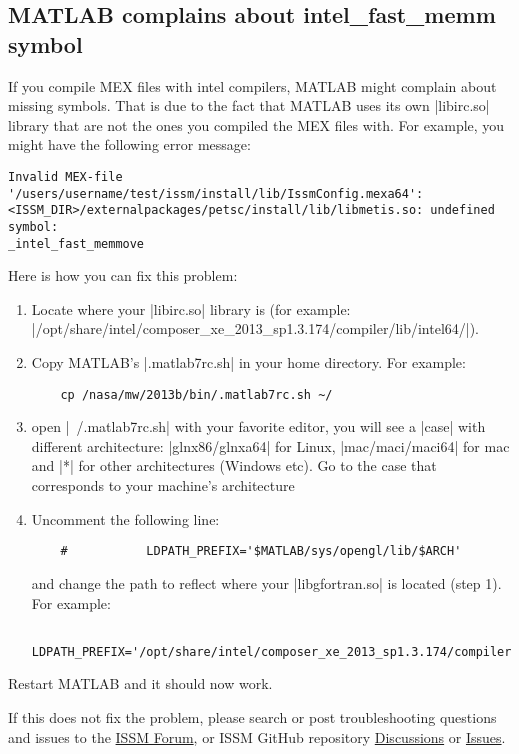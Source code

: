 \subsection*{MATLAB complains about intel\_fast\_memm symbol}%
If you compile MEX files with intel compilers, MATLAB might complain about missing symbols. That is due to the fact that MATLAB uses its own \lstinlinebg|libirc.so| library that are not the ones you compiled the MEX files with. For example, you might have the following error message:
\begin{lstlisting}
Invalid MEX-file '/users/username/test/issm/install/lib/IssmConfig.mexa64':
<ISSM_DIR>/externalpackages/petsc/install/lib/libmetis.so: undefined symbol:
_intel_fast_memmove
\end{lstlisting}

Here is how you can fix this problem:
\begin{enumerate}
	\item Locate where your \lstinlinebg|libirc.so| library is (for example: \newline\lstinlinebg|/opt/share/intel/composer_xe_2013_sp1.3.174/compiler/lib/intel64/|).
	\item Copy MATLAB's \lstinlinebg|.matlab7rc.sh| in your home directory. For example:
	\begin{lstlisting}
	cp /nasa/mw/2013b/bin/.matlab7rc.sh ~/ 
	\end{lstlisting}
	\item open \lstinlinebg|~/.matlab7rc.sh| with your favorite editor, you will see a \lstinlinebg|case| with different architecture: \lstinlinebg|glnx86/glnxa64| for Linux, \lstinlinebg|mac/maci/maci64| for mac and \lstinlinebg|*| for other architectures (Windows etc). Go to the case that corresponds to your machine's architecture
	\item Uncomment the following line:
	\begin{lstlisting}
	#           LDPATH_PREFIX='$MATLAB/sys/opengl/lib/$ARCH'
	\end{lstlisting}
	and change the path to reflect where your \lstinlinebg|libgfortran.so| is located (step 1). For example:
	\begin{lstlisting}
	LDPATH_PREFIX='/opt/share/intel/composer_xe_2013_sp1.3.174/compiler/lib/intel64/'
	\end{lstlisting}
\end{enumerate}

Restart MATLAB and it should now work.

If this does not fix the problem, please search or post troubleshooting questions and issues to the \href{https://issm.ess.uci.edu/forum/}{ISSM Forum}, or ISSM GitHub repository \href{https://github.com/ISSMteam/ISSM/discussions}{Discussions} or \href{https://github.com/ISSMteam/ISSM/issues}{Issues}.
